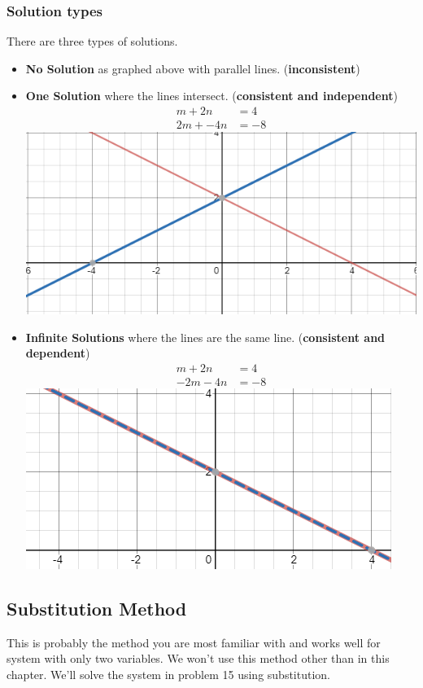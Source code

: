 \documentclass[14pt]{extarticle}
\begin{document}
\begin{itemize}
\subsubsection*{Solution types}
There are three types of solutions.
\begin{itemize}
	\item \textbf{No Solution} as graphed above with parallel lines. (\textbf{inconsistent})
	\item \textbf{One Solution} where the lines intersect. (\textbf{consistent and independent})
	\begin{align*}
		m+2n &= 4 \tag{a}\\
		2m + -4n &= -8 \tag{c}
	\end{align*}
	\includegraphics[width=0.45\linewidth]{4-1_a-15b}
	\item \textbf{Infinite Solutions} where the lines are the same line. (\textbf{consistent and dependent})
	\begin{align*}
		m+2n &= 4 \tag{a}\\
		-2m - 4n &= -8 \tag{d}
	\end{align*}
	\includegraphics[width=0.45\linewidth]{4-1_a-15c}
\end{itemize}
\end{itemize}

\subsection*{Substitution Method}
This is probably the method you are most familiar with and works well for system with only two variables. We won't use this method other than in this chapter. We'll solve the system in problem 15 using substitution.
\end{document}
